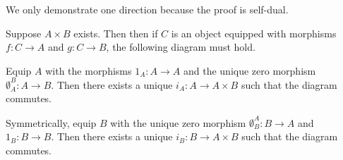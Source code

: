 \begin{prf}
        We only demonstrate one direction because the proof is self-dual. 

        Suppose $A \times B$ exists. Then then if $C$ is an object equipped 
        with morphisms $f: C \to A$ and $g: C \to B$, the following diagram 
        must hold. 
        \begin{center}
        \end{center}
        Equip $A$ with the morphisms $1_A: A \to A$ and the unique  
        zero morphism $\emptyset_A^B: A \to B$. Then there exists a unique 
        $i_A: A \to A \times B$ such that the diagram commutes. 
        \begin{center}
        \end{center} 
        Symmetrically, equip $B$ with the unique zero morphism $\emptyset_B^A: B \to A$
        and $1_B: B \to B$. Then there exists a unique $i_B: B \to A\times B$ such that the 
        diagram commutes.
        \begin{center}
\end{center}
\end{prf}

